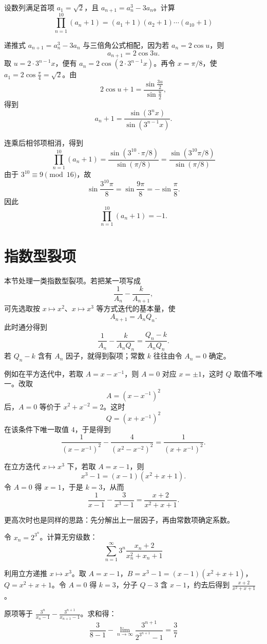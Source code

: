\begin{example}
   设数列满足首项 \(a_1 = \sqrt{2}\)，且 \(a_{n+1} = a_n^3 - 3a_n\)。计算$$ \prod_{n=1}^{10} (a_n + 1) = (a_1+1)(a_2+1) \cdots (a_{10}+1) $$
\end{example}
\begin{solution}
递推式 \(a_{n+1}=a_n^3-3a_n\) 与三倍角公式相配，因为若 \(a_n=2\cos u\)，则
\[
a_{n+1}=2\cos 3u.
\]
取 \(u=2\cdot 3^{n-1}x\)，便有 \(a_n=2\cos(2\cdot3^{n-1}x)\)。再令 \(x=\pi/8\)，使 \(a_1=2\cos\frac{\pi}{4}=\sqrt2\)。由
\[
2\cos u+1=\frac{\sin\frac{3u}{2}}{\sin\frac{u}{2}},
\]
得到
\[
a_n+1=\frac{\sin(3^n x)}{\sin(3^{n-1}x)}.
\]

连乘后相邻项相消，得到
\[
\prod_{n=1}^{10} (a_n + 1) = \frac{\sin(3^{10} \cdot \pi/8)}{\sin(\pi/8)} = \frac{\sin(3^{10}\pi/8)}{\sin(\pi/8)}
\]
由于 \(3^{10}\equiv 9 \pmod{16}\)，故
\[
\sin\frac{3^{10}\pi}{8}=\sin\frac{9\pi}{8}=-\sin\frac{\pi}{8}.
\]
因此
\[
\prod_{n=1}^{10} (a_n + 1)=-1.
\]
\end{solution}

\section{指数型裂项}

本节处理一类指数型裂项。若把某一项写成
\[
\frac{1}{A_n}-\frac{k}{A_{n+1}},
\]
可先选取按 \(x\mapsto x^2\)、\(x\mapsto x^3\) 等方式迭代的基本量，使
\[
A_{n+1}=A_nQ_n.
\]
此时通分得到
\[
\frac{1}{A_n}-\frac{k}{A_nQ_n}=\frac{Q_n-k}{A_nQ_n}.
\]
若 \(Q_n-k\) 含有 \(A_n\) 因子，就得到裂项；常数 \(k\) 往往由令 \(A_n=0\) 确定。

例如在平方迭代中，若取 \(A=x-x^{-1}\)，则 \(A=0\) 对应 \(x=\pm1\)，这时 \(Q\) 取值不唯一。改取
\[
A=(x-x^{-1})^2
\]
后，\(A=0\) 等价于 \(x^2+x^{-2}=2\)。这时
\[
Q=(x+x^{-1})^2
\]
在该条件下唯一取值 \(4\)，于是得到
\[
\frac{1}{(x-x^{-1})^2}-\frac{4}{(x^2-x^{-2})^2}=\frac{1}{(x+x^{-1})^2}.
\]

在立方迭代 \(x\mapsto x^3\) 下，若取 \(A=x-1\)，则
\[
x^3-1=(x-1)(x^2+x+1).
\]
令 \(A=0\) 得 \(x=1\)，于是 \(k=3\)，从而
\[
\frac{1}{x-1}-\frac{3}{x^3-1}=\frac{x+2}{x^2+x+1}.
\]

更高次时也是同样的思路：先分解出上一层因子，再由常数项确定系数。


\begin{example}
    令 \(x_n = 2^{3^n}\)。计算无穷级数：$$ \sum_{n=1}^{\infty} 3^n \frac{x_n+2}{x_n^2+x_n+1} $$
\end{example}
\begin{solution}
利用立方递推 \(x\mapsto x^3\)。取 \(A=x-1\)，\(B=x^3-1=(x-1)(x^2+x+1)\)，\(Q=x^2+x+1\)。令 \(A=0\) 得 \(k=3\)，分子 \(Q-3\) 含 \(x-1\)，约去后得到 \(\frac{x+2}{x^2+x+1}\)。

原项等于 \(\frac{3^n}{x_n-1} - \frac{3^{n+1}}{x_{n+1}-1}\)。求和得：
\[
\frac{3}{8-1} - \lim_{n\to\infty} \frac{3^{n+1}}{2^{3^{n+1}}-1} = \frac{3}{7}
\]

\end{solution}

